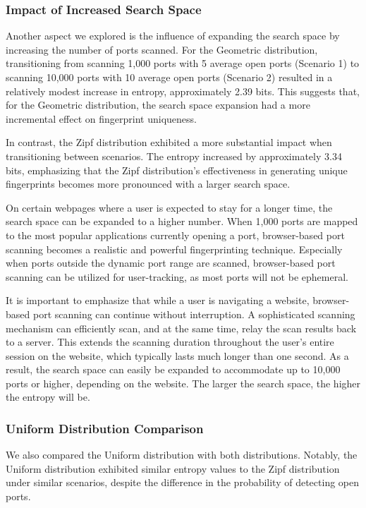 \subsubsection{Impact of Increased Search Space}

Another aspect we explored is the influence of expanding the search space by increasing the number of ports scanned.
For the Geometric distribution, transitioning from scanning 1,000 ports with 5 average open ports (Scenario 1) to scanning 10,000 ports with 10 average open ports (Scenario 2) resulted in a relatively modest increase in entropy, approximately 2.39 bits. This suggests that, for the Geometric distribution, the search space expansion had a more incremental effect on fingerprint uniqueness.

In contrast, the Zipf distribution exhibited a more substantial impact when transitioning between scenarios. The entropy increased by approximately 3.34 bits, emphasizing that the Zipf distribution's effectiveness in generating unique fingerprints becomes more pronounced with a larger search space.

On certain webpages where a user is expected to stay for a longer time, the search space can be expanded to a higher number. When 1,000 ports are mapped to the most popular applications currently opening a port, browser-based port scanning becomes a realistic and powerful fingerprinting technique. Especially when ports outside the dynamic port range are scanned, browser-based port scanning can be utilized for user-tracking, as most ports will not be ephemeral.

It is important to emphasize that while a user is navigating a website, browser-based port scanning can continue without interruption. A sophisticated scanning mechanism can efficiently scan, and at the same time, relay the scan results back to a server. This extends the scanning duration throughout the user's entire session on the website, which typically lasts much longer than one second. As a result, the search space can easily be expanded to accommodate up to 10,000 ports or higher, depending on the website. The larger the search space, the higher the entropy will be.

\subsubsection{Uniform Distribution Comparison}

We also compared the Uniform distribution with both distributions.
Notably, the Uniform distribution exhibited similar entropy values to the Zipf distribution under similar scenarios, despite the difference in the probability of detecting open ports.

